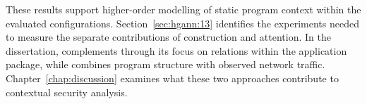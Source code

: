 These results support higher-order modelling of static program context within the evaluated
configurations. Section~\ref{sec:hgann:13} identifies the experiments needed to measure the
separate contributions of construction and attention. In the dissertation, \hgann{} complements
\hybroid{} through its focus on relations within the application package, while \hybroid{}
combines program structure with observed network traffic. Chapter~\ref{chap:discussion}
examines what these two approaches contribute to contextual security analysis.
